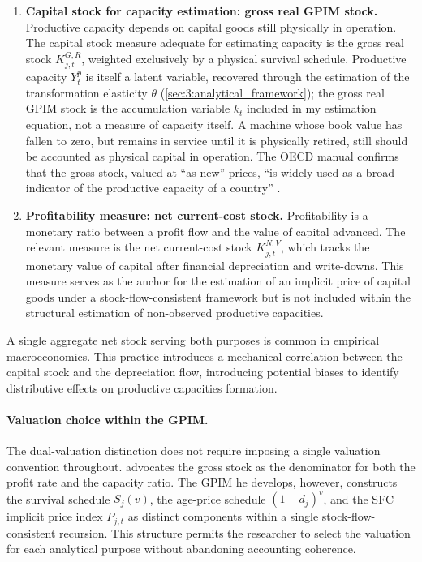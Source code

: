 \begin{enumerate}
	\item \textbf{Capital stock for capacity estimation: gross real
		GPIM stock.}
	Productive capacity depends on capital goods still physically in
	operation. The capital stock measure adequate for estimating
	capacity is the gross real stock $K^{G,R}_{j,t}$, weighted
	exclusively by a physical survival schedule. Productive capacity
	$Y^p_t$ is itself a latent variable, recovered through the
	estimation of the transformation elasticity $\theta$
	(\cref{sec:3:analytical_framework}); the gross real GPIM stock is
	the accumulation variable $k_t$ included in my estimation
	equation, not a measure of capacity itself. A machine whose book value has
	fallen to zero, but remains in service until it is physically retired, still should be accounted as physical capital in operation.  The OECD manual confirms that the gross stock, valued at ``as
	new'' prices, ``is widely used as a broad indicator of the
	productive capacity of a country'' \citep{OECD2001}.
	
	\item \textbf{Profitability measure: net current-cost stock.}
	Profitability is a monetary ratio between a profit flow and the
	value of capital advanced. The relevant measure is the net
	current-cost stock $K^{N,V}_{j,t}$, which tracks the monetary
	value of capital after financial depreciation and write-downs.
	This measure serves as the anchor for the estimation of an implicit 
	price of capital goods under a stock-flow-consistent framework but is not included within the structural estimation of non-observed productive capacities. 
\end{enumerate}

A single aggregate net stock serving both purposes is common in
empirical macroeconomics. This practice introduces a mechanical
correlation between the capital stock and the depreciation flow,
introducing potential biases to identify distributive effects on productive capacities formation. 

\paragraph{Valuation choice within the GPIM.}
The dual-valuation distinction does not require imposing a single
valuation convention throughout. \citet[App.~6.3]{Shaikh2016}
advocates the gross stock as the denominator for both the profit
rate and the capacity ratio. The GPIM he develops, however,
constructs the survival schedule $S_j(v)$, the age-price schedule
$(1-d_j)^v$, and the SFC implicit price index $P_{j,t}$ as distinct
components within a single stock-flow-consistent recursion. This
structure permits the researcher to select the valuation for each
analytical purpose without abandoning accounting coherence.

